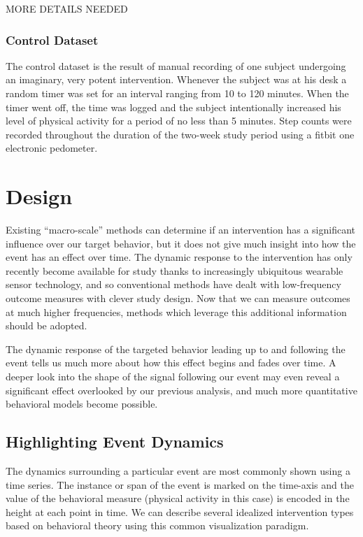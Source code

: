 \documentclass[review,journal]{vgtc}         %
\begin{document}
MORE DETAILS NEEDED

\subsubsection{Control Dataset}
The control dataset is the result of manual recording of one subject undergoing an imaginary, very potent intervention.
Whenever the subject was at his desk a random timer was set for an interval ranging from 10 to 120 minutes.
When the timer went off, the time was logged and the subject intentionally increased his level of physical activity for a period of no less than 5 minutes.
Step counts were recorded throughout the duration of the two-week study period using a fitbit one electronic pedometer.

\section{Design}
Existing “macro-scale” methods can determine if an intervention has a significant influence over our target behavior, but it does not give much insight into how the event has an effect over time.
The dynamic response to the intervention has only recently become available for study thanks to increasingly ubiquitous wearable sensor technology, and so conventional methods have dealt with low-frequency outcome measures with clever study design.
Now that we can measure outcomes at much higher frequencies, methods which leverage this additional information should be adopted.

The dynamic response of the targeted behavior leading up to and following the event tells us much  more about how this effect begins and fades over time.
A deeper look into the shape of the signal following our event may even reveal a significant effect overlooked by our previous analysis, and much more quantitative behavioral models become possible.

\subsection{Highlighting Event Dynamics}
The dynamics surrounding a particular event are most commonly shown using a time series.
The instance or span of the event is marked on the time-axis and the value of the behavioral measure (physical activity in this case) is encoded in the height at each point in time.
We can describe several idealized intervention types based on behavioral theory using this common visualization paradigm.
\end{document}
